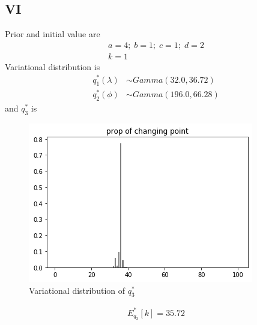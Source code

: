 \documentclass[11pt]{article}
\begin{document}
	\subsection{VI}
	Prior and initial value are
	\begin{align*}
	a = 4;\;
	b = 1;\;
	c = 1;\;
	d = 2\\
	k = 1
	\end{align*}
	Variational distribution is
	\begin{align*}
	q_1^*(\lambda)  &\sim Gamma(32.0, 36.72)\\
	q_2^*(\phi) &\sim Gamma(196.0, 66.28)
	\end{align*}
	and $q_3^*$ is
	\begin{figure} [h]
		\centering
		\includegraphics[width=0.7\linewidth]{vi}
		\caption{Variational distribution of $q_3^*$}
		\label{fig:vi}
	\end{figure}
	\begin{align*}
	E_{q_3}^*[k] = 35.72
	\end{align*}
\end{document}
